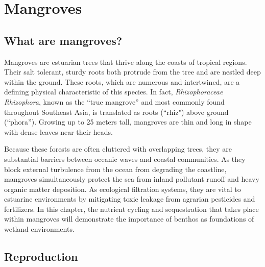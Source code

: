 \section{Mangroves}

\subsection{What are mangroves?}

Mangroves are estuarian trees that thrive along the coasts of tropical regions. Their salt tolerant, sturdy roots both protrude from the tree and are nestled deep within the ground. These roots, which are numerous and intertwined, are a defining physical characteristic of this species. In fact, \textit{Rhizophoraceae Rhizophora}, known as the ``true mangrove'' and most commonly found throughout Southeast Asia, is translated as roots (``rhiz") above ground (``phora''). Growing up to 25 meters tall, mangroves are thin and long in shape with dense leaves near their heads. 

Because these forests are often cluttered with overlapping trees, they are substantial barriers between oceanic waves and coastal communities. As they block external turbulence from the ocean from degrading the coastline, mangroves simultaneously protect the sea from inland pollutant runoff and heavy organic matter deposition.  As ecological filtration systems, they are vital to estuarine environments by mitigating toxic leakage from agrarian pesticides and fertilizers. In this chapter, the nutrient cycling and sequestration that takes place within mangroves will demonstrate the importance of benthos as foundations of wetland environments.




      
      
\subsection{Reproduction}


